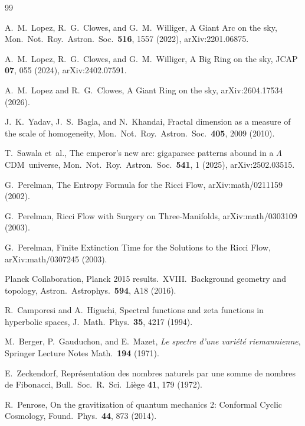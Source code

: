 \documentclass[
  aps,
  prd,
  reprint,
  superscriptaddress,
  nofootinbib,
  longbibliography,
  floatfix,
  amsmath,
  amssymb
]{revtex4-2}
\theoremstyle{plain}
\theoremstyle{definition}
\theoremstyle{remark}
\newcommand{\LCDM}{\ensuremath{\Lambda}CDM}
\begin{document}
\begin{thebibliography}{99}

A.~M.~Lopez, R.~G.~Clowes, and G.~M.~Williger,
A Giant Arc on the sky,
Mon.\ Not.\ Roy.\ Astron.\ Soc.\ \textbf{516}, 1557 (2022),
arXiv:2201.06875.

A.~M.~Lopez, R.~G.~Clowes, and G.~M.~Williger,
A Big Ring on the sky,
JCAP \textbf{07}, 055 (2024), arXiv:2402.07591.

A.~M.~Lopez and R.~G.~Clowes,
A Giant Ring on the sky,
arXiv:2604.17534 (2026).

J.~K.~Yadav, J.~S.~Bagla, and N.~Khandai,
Fractal dimension as a measure of the scale of homogeneity,
Mon.\ Not.\ Roy.\ Astron.\ Soc.\ \textbf{405}, 2009 (2010).

T.~Sawala et~al.,
The emperor's new arc: gigaparsec patterns abound in a \LCDM\ universe,
Mon.\ Not.\ Roy.\ Astron.\ Soc.\ \textbf{541}, 1 (2025),
arXiv:2502.03515.

G.~Perelman,
The Entropy Formula for the Ricci Flow,
arXiv:math/0211159 (2002).

G.~Perelman,
Ricci Flow with Surgery on Three-Manifolds,
arXiv:math/0303109 (2003).

G.~Perelman,
Finite Extinction Time for the Solutions to the Ricci Flow,
arXiv:math/0307245 (2003).

Planck Collaboration,
Planck 2015 results.\ XVIII.\ Background geometry and topology,
Astron.\ Astrophys.\ \textbf{594}, A18 (2016).

R.~Camporesi and A.~Higuchi,
Spectral functions and zeta functions in hyperbolic spaces,
J.\ Math.\ Phys.\ \textbf{35}, 4217 (1994).

M.~Berger, P.~Gauduchon, and E.~Mazet,
\textit{Le spectre d'une vari\'et\'e riemannienne},
Springer Lecture Notes Math.\ \textbf{194} (1971).

E.~Zeckendorf,
Repr\'esentation des nombres naturels par une somme de nombres de Fibonacci,
Bull.\ Soc.\ R.\ Sci.\ Li\`ege \textbf{41}, 179 (1972).

R.~Penrose,
On the gravitization of quantum mechanics 2: Conformal Cyclic Cosmology,
Found.\ Phys.\ \textbf{44}, 873 (2014).


\end{thebibliography}
\end{document}
